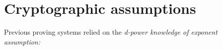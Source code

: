 \documentclass[11pt]{article}
\numberwithin{figure}{section} %
\begin{document}
% 
% 
% 
% 
% 
% 

\section{Cryptographic assumptions}

Previous proving systems \cite{GGPR, PHGR} relied on the \emph{d-power knowledge of exponent assumption:}
\end{document}
